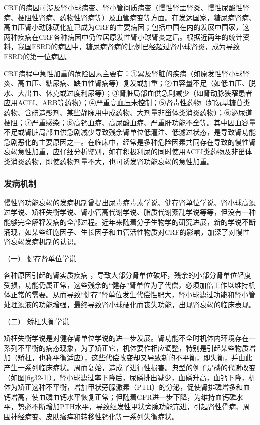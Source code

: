 CRF的病因可涉及肾小球病变、肾小管间质病变（慢性肾盂肾炎、慢性尿酸性肾病、梗阻性肾病、药物性肾病等）及血管病变等方面。在发达国家，糖尿病肾病、高血压肾小动脉硬化症已成为CRF的主要病因；包括中国在内的发展中国家，这两种疾病在CRF各种病因中仍位居原发性肾小球肾炎之后。根据近两年的统计资料，我国ESRD的病因中，糖尿病肾病的比例已经超过肾小球肾炎，成为导致ESRD的第一位病因。

CRF病程中急性加重的危险因素主要有：①累及肾脏的疾病（如原发性肾小球肾炎、高血压、糖尿病、缺血性肾病等）复发或加重；②血容量不足（如低血压、脱水、大出血、休克或过度利尿等）；③肾脏局部血供急剧减少（如肾动脉狭窄患者应用ACEI、ARB等药物）；④严重高血压未控制；⑤肾毒性药物（如氨基糖苷类药物、含碘造影剂、某些静脉用中成药物、大剂量非甾体类消炎药物）；⑥泌尿道梗阻；⑦严重感染；⑧高钙血症、高尿酸血症、严重肝功能不全等。其中因血容量不足或肾脏局部血供急剧减少导致残余肾单位低灌注、低滤过状态，是导致肾功能急剧恶化的主要原因之一。在临床中，经常是多种危险因素共同存在导致的慢性肾衰竭急性加重，应仔细分析鉴别，如在积极利尿的同时使用ACEI类药物及非甾体类消炎药物，即使药物剂量不大，也可诱发肾功能衰竭的急性加重。

\subsubsection{发病机制}

慢性肾功能衰竭的发病机制曾提出尿毒症毒素学说、健存肾单位学说、肾小球高滤过学说、矫枉失衡学说、肾小管高代谢学说、脂质代谢紊乱学说等等，但没有一种能够完全解释发病的全部过程。近年来随着分子生物学的研究进展，新的学说不断涌现，如某些细胞因子、生长因子和血管活性物质对CRF的影响，加深了对慢性肾衰竭发病机制的认识。

\hypertarget{text00085.htmlux5cux23CHP3-8-5-2-1}{}
（一） 健存肾单位学说

各种原因引起的肾实质疾病
，导致大部分肾单位破坏，残余的小部分肾单位轻度受损，功能仍属正常，这些残余的“健存”肾单位为了代偿，必须加倍工作以维持机体正常的需要。从而导致“健存”肾单位发生代偿性肥大，肾小球滤过功能和肾小管处理滤液的功能增强，最终导致肾小球硬化而丧失功能，出现肾衰竭的临床表现。

\hypertarget{text00085.htmlux5cux23CHP3-8-5-2-2}{}
（二） 矫枉失衡学说

矫枉失衡学说是对健存肾单位学说的进一步发展。肾功能不全时机体内环境存在一系列不平衡的病态现象，为了矫正它，机体要作相应调整，特别是引起某些物质增加（矫枉，也称平衡适应），这些代偿改变却又导致新的不平衡，即失衡，并由此产生一系列临床症状。周而复始，造成了进行性损害。典型的例子是磷的代谢改变（如图\ref{fig32-1}）。肾小球滤过率下降后，尿磷排出减少，血磷升高，血钙下降，机体为矫正这种不平衡，增加甲状旁腺激素（PTH）的分泌，促使肾排磷增多和血钙增高，使血磷血钙水平恢复正常；但随着GFR进一步下降，为维持血钙磷水平，势必不断增加PTH水平，导致继发性甲状旁腺功能亢进，引起肾性骨病、周围神经病变、皮肤瘙痒和转移性钙化等一系列失衡症状。

